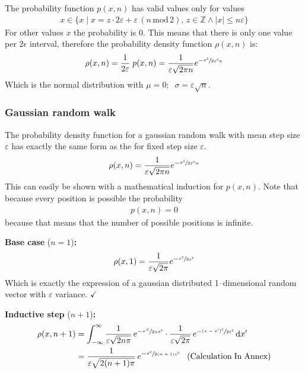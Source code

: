\documentclass[a4paper, parskip=half]{scrartcl}
\newcommand{\diff}{\mathop{}\!\mathrm{d}}
\newcommand{\myEqLabel}[1]{\label{eq:#1}}
\newcommand{\myEqAnnex}[1]{\;\;\;\mathrm{(Calculation\;In\;Annex)} \myEqLabel{#1}}
\begin{document}
The probability function $p(x,n)$ has valid values only for values 
\begin{align}
x \in \{x\; |\; x = z \cdot 2 \varepsilon + \varepsilon\, (n\,\mathrm{mod}\, 2),\, z \in \mathbb{Z} \wedge |x| \leq n \varepsilon\} 
\end{align}
For other values $x$ the probability is $0$. This means that there is only one value per $2\epsilon$ interval, therefore the probability density function $\rho(x,n)$ is:
\begin{align}
\rho(x,n) = \frac{1}{2\varepsilon}\; p(x,n) = \frac{1}{\varepsilon\sqrt{2\pi n}} e^{-\sfrac{x^2}{2\varepsilon^2 n}} \myEqLabel{rho_binom}
\end{align}
Which is the normal distribution with $\mu = 0;\;\; \sigma =  \varepsilon\sqrt{n}$.

\subsubsection{Gaussian random walk}
The probability density function for a gaussian random walk with mean step size $\varepsilon$ has exactly the same form as the for fixed step size $\varepsilon$.
\begin{align}
\rho(x,n) = \frac{1}{\varepsilon\sqrt{2\pi n}} e^{-\sfrac{x^2}{2\varepsilon^2 n}} \myEqLabel{rho_gauss}
\end{align}
This can easily be shown with a mathematical induction for $p(x,n)$. Note that because every position is possible the probability 
\begin{align}
p(x,n) = 0 
\end{align}
because that means that the number of possible positions is infinite.

\textbf{Base case} ($n = 1$)\textbf{:}
\begin{align}
\rho(x,1) = \frac{1}{\varepsilon\sqrt{2\pi}} e^{-\sfrac{x^2}{2\varepsilon^2}}
\end{align}
Which is exactly the expression of a gaussian distributed 1--dimensional random vector with $\varepsilon$ variance. $\checkmark$

\textbf{Inductive step} ($n + 1$)\textbf{:}
\begin{align}
\rho(x,n+1) &= \int_{-\infty}^\infty \frac{1}{\varepsilon\sqrt{2n\pi}}\, e^{-\sfrac{x'^2}{2n\varepsilon^2}} \cdot \frac{1}{\varepsilon\sqrt{2\pi}}\, e^{-\sfrac{(x - x')^2}{2\varepsilon^2}} \diff x'\\
&= \frac{1}{\varepsilon\sqrt{2(n+1)\pi}}\, e^{-\sfrac{x^2}{2(n+1)\varepsilon^2}} \myEqAnnex{gauss_random_walk}
\end{align}
\end{document}
